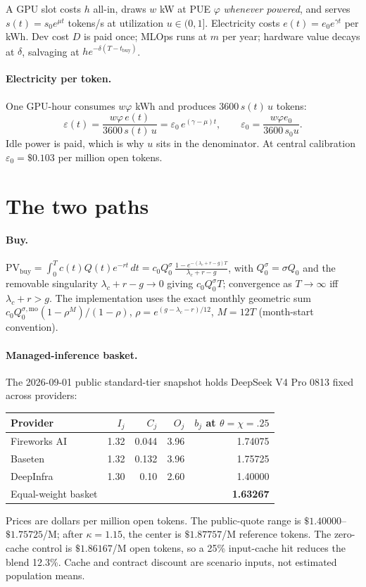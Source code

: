 \documentclass[11pt]{article}
\begin{document}
A GPU slot costs $h$ all-in, draws $w$ kW at PUE $\varphi$ \emph{whenever powered}, and
serves $s(t)=s_0e^{\mu t}$ tokens/s at utilization $u\in(0,1]$. Electricity costs
$e(t)=e_0e^{\gamma t}$ per kWh. Dev cost $D$ is paid once; MLOps runs at $m$ per year;
hardware value decays at $\delta$, salvaging at $he^{-\delta(T-t_{\mathrm{buy}})}$.

\paragraph{Electricity per token.} One GPU-hour consumes $w\varphi$ kWh and produces
$3600\,s(t)\,u$ tokens:
\begin{equation}
\varepsilon(t)=\frac{w\varphi\,e(t)}{3600\,s(t)\,u}
=\varepsilon_0\,e^{(\gamma-\mu)t},\qquad
\varepsilon_0=\frac{w\varphi e_0}{3600\,s_0 u}.
\label{eq:eps}
\end{equation}
Idle power is paid, which is why $u$ sits in the denominator. At central calibration
$\varepsilon_0=\$0.103$ per million open tokens.

\section{The two paths}
\paragraph{Buy.} $\mathrm{PV}_{\mathrm{buy}}
=\int_0^T c(t)Q(t)e^{-rt}\,dt
= c_0 Q_0^{\sigma}\,\frac{1-e^{-(\lambda_c+r-g)T}}{\lambda_c+r-g}$,
with $Q_0^\sigma=\sigma Q_0$ and the removable singularity
$\lambda_c+r-g\to0$ giving $c_0Q_0^\sigma T$; convergence as $T\to\infty$ iff
$\lambda_c+r>g$. The implementation uses the exact monthly geometric sum
$c_0 Q_0^{\sigma,\mathrm{mo}}(1-\rho^{M})/(1-\rho)$, $\rho=e^{(g-\lambda_c-r)/12}$,
$M=12T$ (month-start convention).

\paragraph{Managed-inference basket.} The 2026-09-01 public standard-tier snapshot holds
DeepSeek V4 Pro 0813 fixed across providers:
\begin{center}\small
\begin{tabular}{lrrrr}
\toprule
Provider & $I_j$ & $C_j$ & $O_j$ & $b_j$ at $\theta=\chi=.25$\\
\midrule
Fireworks AI & 1.32 & 0.044 & 3.96 & 1.74075\\
Baseten & 1.32 & 0.132 & 3.96 & 1.75725\\
DeepInfra & 1.30 & 0.10 & 2.60 & 1.40000\\
\midrule
Equal-weight basket & & & & \textbf{1.63267}\\
\bottomrule
\end{tabular}
\end{center}
Prices are dollars per million open tokens. The public-quote range is
$\$1.40000$--$\$1.75725$/M; after $\kappa=1.15$, the center is $\$1.87757$/M reference
tokens. The zero-cache control is $\$1.86167$/M open tokens, so a 25\% input-cache hit
reduces the blend 12.3\%. Cache and contract discount are scenario inputs, not estimated
population means.
\end{document}
